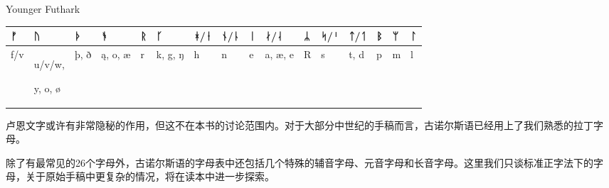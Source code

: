 Younger Futhark

\begin{longtable}{llllllllllllllll}
  \toprule
  ᚠ       & ᚢ      & ᚦ       & ᚬ & ᚱ       & ᚴ & ᚼ/ᚽ & ᚾ/ᚿ & ᛁ       & ᛅ/ᛆ & ᛦ & ᛋ/ᛌ & ᛏ/ᛐ & ᛒ & ᛘ & ᛚ \\
  \midrule
  \endhead
  \bottomrule
  \endfoot
  f/v     & u/v/w,

  y, o, ø & þ, ð   & ą, o, æ & r & k, g, ŋ & h & n   & e   & a, æ, e & R   & s &
  t, d    & p      & m       & l                                                                       \\
\end{longtable}

卢恩文字或许有非常隐秘的作用，但这不在本书的讨论范围内。对于大部分中世纪的手稿而言，古诺尔斯语已经用上了我们熟悉的拉丁字母。

除了有最常见的26个字母外，古诺尔斯语的字母表中还包括几个特殊的辅音字母、元音字母和长音字母。这里我们只谈标准正字法下的字母，关于原始手稿中更复杂的情况，将在读本中进一步探索。

